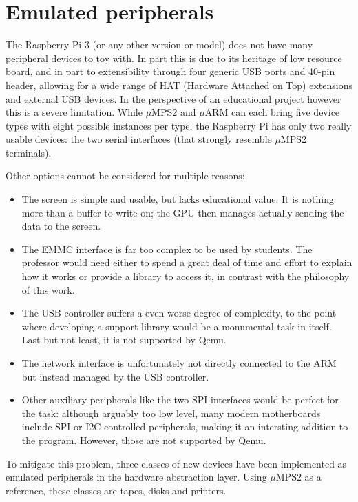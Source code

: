 \documentclass[12pt,a4paper,openright,twoside]{report}
\begin{document}
\clearpage{\pagestyle{empty}\cleardoublepage}
\chapter{Emulated peripherals}
\label{emulated}
The Raspberry Pi 3 (or any other version or model) does not have many peripheral
devices to toy with. In part this is due to its heritage of low resource board, 
and in part to extensibility through four generic USB ports and 40-pin header,
allowing for a wide range of HAT (Hardware Attached on Top) extensions and external
USB devices.
In the perspective of an educational project however this is a severe limitation.
While $\mu$MPS2 and $\mu$ARM can each bring five device types with eight possible
instances per type, the Raspberry Pi has only two really usable devices: the 
two serial interfaces (that strongly resemble $\mu$MPS2 terminals).

Other options cannot be considered for multiple reasons:
\begin{itemize}
    \item The screen is simple and usable, but lacks educational value. It is 
        nothing more than a buffer to write on; the GPU then manages actually
        sending the data to the screen.
    \item The EMMC interface is far too complex to be used by students. The professor
        would need either to spend a great deal of time and effort to explain how
        it works or provide a library to access it, in contrast with the philosophy
        of this work.
    \item The USB controller suffers a even worse degree of complexity, to the point
        where developing a support library would be a monumental task in itself.
        Last but not least, it is not supported by Qemu.
    \item The network interface is unfortunately not directly connected to the ARM
        but instead managed by the USB controller.
    \item Other auxiliary peripherals like the two SPI interfaces would be perfect
        for the task: although arguably too low level, many modern motherboards
        include SPI or I2C controlled peripherals, making it an intersting addition
        to the program. However, those are not supported by Qemu.
\end{itemize}

To mitigate this problem, three classes of new devices have been implemented as 
emulated peripherals in the hardware abstraction layer. Using $\mu$MPS2 as a reference,
these classes are tapes, disks and printers.
\end{document}
